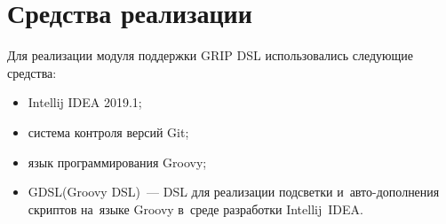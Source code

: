 \section{Средства реализации} \label{sub22}

Для реализации модуля поддержки GRIP DSL использовались следующие средства:

\begin{itemize} 
\item{Intellij IDEA 2019.1;}	
\item{система контроля версий Git;}
\item{язык программирования Groovy;}
\item{GDSL(Groovy DSL)~--- DSL для реализации подсветки и~авто-дополнения скриптов на~языке Groovy в~среде разработки Intellij~IDEA.}
\end{itemize}